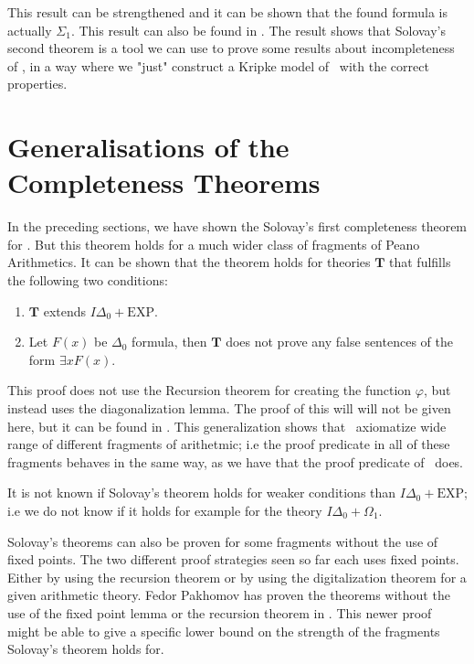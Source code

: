 \documentclass[../main.tex]{subfiles}
\begin{document}
This result can be strengthened and it can be shown that the found formula is
actually $\Sigma_1$. This result can also be found in \citet{Smor1985}.
The result shows that Solovay's second theorem is a tool we can use to prove
some results about incompleteness of \PRA, in a way where we "just" construct a
Kripke model of \GL\ with the correct properties.
\section{Generalisations  of the Completeness Theorems}

In the preceding sections, we have shown the Solovay's first completeness theorem for \PRA.
But this theorem holds for a much wider class of fragments of Peano
Arithmetics. It can be shown that the theorem holds for
theories $\textbf{T}$ that fulfills the following two conditions:
\begin{enumerate}
	\item $\textbf{T}$ extends $I\Delta_0+\text{EXP}$.
	\item Let $F(x)$ be $ \Delta_0$ formula, then $\textbf{T}$ does not prove any
		false sentences of the form $\exists x F(x)$.
\end{enumerate}

This proof does not use the Recursion theorem for creating the function
$\varphi$, but instead uses the diagonalization lemma. The
proof of this will will not be given here, but it can be found in
\citet{Dick1991}. This generalization shows that \GL\ axiomatize wide
range of different fragments of arithetmic; i.e the proof predicate in all of
these fragments behaves in the same way, as we have that the proof predicate of
\PRA\ does.

It is not known if Solovay's theorem holds for weaker conditions than
$I\Delta_0+\text{EXP}$; i.e we do not know if it holds for example for the theory
$I\Delta_0+\Omega_1$.



Solovay's theorems can also be proven for some fragments without the use of
fixed points. The two different proof strategies seen so far each uses fixed
points. Either by using the recursion theorem or by using the digitalization
theorem for a given arithmetic theory. Fedor Pakhomov has proven the theorems
without the use of the fixed point lemma or the recursion theorem in
\citet{Fedo2017}. This
newer proof might be able to give a specific lower bound on the strength of
the fragments Solovay's theorem holds for.
\end{document}
